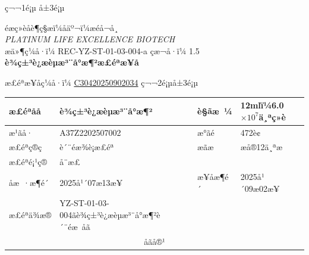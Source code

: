 \documentclass[UTF8,10pt,a4paper,fontset=fandol]{ctexart}
\newcommand{\fieldvalue}[1]{#1}
\begin{document}
\normalsize
\begin{center}
ç¬¬1é¡µ å±3é¡µ
\end{center}


\newpage

\begin{center}
éæç»èåè¶ç§æï¼åäº¬ï¼æéå¬å¸\\
\textit{PLATINUM LIFE EXCELLENCE BIOTECH}\\[0.5em]
æä»¶ç¼å·ï¼
\fieldvalue{REC-YZ-ST-01-03-004-a}
\qquad çæ¬å·ï¼
\fieldvalue{1.5}\\[0.5em]
{\large\textbf{è¾ç±³è¿æèµæ³¨å°æ¶²æ£éªæ¥å}}
\end{center}

æ£éªæ¥åç¼å·ï¼
\fieldvalue{\underline{C30420250902034}}
ç¬¬2é¡µå±3é¡µ

\begin{tabularx}{\textwidth}{|p{3.2cm}|X|p{3.0cm}|X|}
\hline
æ£éªåå &
\fieldvalue{è¾ç±³è¿æèµæ³¨å°æ¶²}
& è§ãæ ¼ &
\fieldvalue{12mlï¼6.0$\times 10^{7}$ä¸ªç»è}
\\ \hline
æ¹ãå· &
\fieldvalue{A37Z2202507002}
& æ°ãé &
\fieldvalue{472è¢}
\\ \hline
æ£éªç®ç &
\fieldvalue{è´¨éæ¾è¡æ£éª}
& æãæ &
\fieldvalue{æå®12ä¸ªæ}
\\ \hline
æ£éªé¡¹ç® &
\fieldvalue{å¨æ£}
& \multicolumn{2}{l|}{}
\\ \hline
åæ ·æ¶é´ &
\fieldvalue{2025å¹´07æ13æ¥}
& æ¥åæ¶é´ &
\fieldvalue{2025å¹´09æ02æ¥}
\\ \hline
æ£éªä¾æ® &
\fieldvalue{YZ-ST-01-03-004ãè¾ç±³è¿æèµæ³¨å°æ¶²è´¨éæ åã}
& \multicolumn{2}{l|}{}
\\ \hline
\multicolumn{4}{|c|}{åãå®¹}\\ \hline
\end{tabularx}
\end{document}
